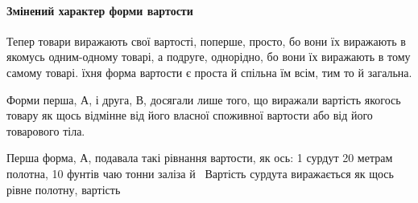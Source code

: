 \paragraph{Змінений характер форми вартости}

Тепер товари виражають свої вартості, поперше, просто, бо
вони їх виражають в яко\-мусь од\-ним-од\-но\-му товарі, а подруге,
однорідно, бо вони їх виражають в тому самому товарі. їхня форма
вартости є проста й спільна їм всім, тим то й загальна.

Форми перша, А, і друга, В, досягали лише того, що виражали
вартість якогось товару як щось відмінне від його власної
споживної вартости або від його товарового тіла.

Перша форма, А, подавала такі рівнання вартости, як ось: 1 сурдут
\deq{} 20 метрам полотна, 10 фунтів чаю \deq{}  тонни заліза й~
Вартість сурдута виражається як щось рівне полотну, вартість
\parbreak{}  %

